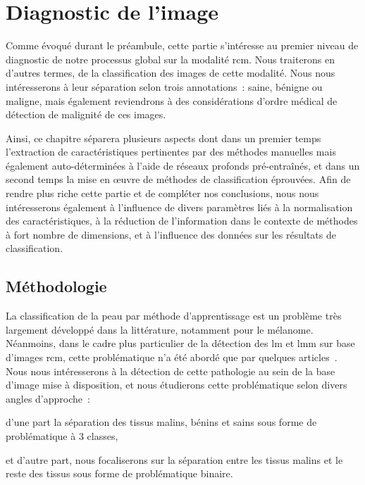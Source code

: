 \renewcommand{\thechapter}{\arabic{chapter}}
\setcounter{chapter}{4}

\chapter{Diagnostic de l'image}
\label{chap:chapter_4}
\chapterintro
Comme évoqué durant le préambule, cette partie s'intéresse au premier niveau de diagnostic de notre processus global sur la modalité \gls{rcm}. Nous traiterons en d'autres termes, de la classification des images de cette modalité. Nous nous intéresserons à leur séparation selon trois annotations~: saine, bénigne ou maligne, mais également reviendrons à des considérations d'ordre médical de détection de malignité de ces images.\par

Ainsi, ce chapitre séparera plusieurs aspects dont dans un premier temps l'extraction de caractéristiques pertinentes par des méthodes manuelles mais également auto-déterminées à l'aide de réseaux profonds pré-entraînés, et dans un second temps la mise en œuvre de méthodes de classification éprouvées. Afin de rendre plus riche cette partie et de compléter nos conclusions, nous nous intéresserons également à l'influence de divers paramètres liés à la normalisation des caractéristiques, à la réduction de l'information dans le contexte de méthodes à fort nombre de dimensions, et à l'influence des données sur les résultats de classification.\par	
\newpage

\section{Méthodologie}
La classification de la peau par méthode d'apprentissage est un problème très largement développé dans la littérature, notamment pour le mélanome. Néanmoins, dans le cadre plus particulier de la détection des \gls{lm} et \gls{lmm} sur base d'images \gls{rcm}, cette problématique n'a été abordé que par quelques articles~\cite{Halimi2017a, Halimi2017b, Wiltgen2008, Koller2011}. Nous nous intéresserons à la détection de cette pathologie au sein de la base d'image mise à disposition, et nous étudierons cette problématique selon divers angles d'approche~: 
\begin{inlinerate}
    \item d'une part la séparation des tissus malins, bénins et sains sous forme de problématique à 3 classes,
    \item et d'autre part, nous focaliserons sur la séparation entre les tissus malins et le reste des tissus sous forme de problématique binaire.
\end{inlinerate}\par

